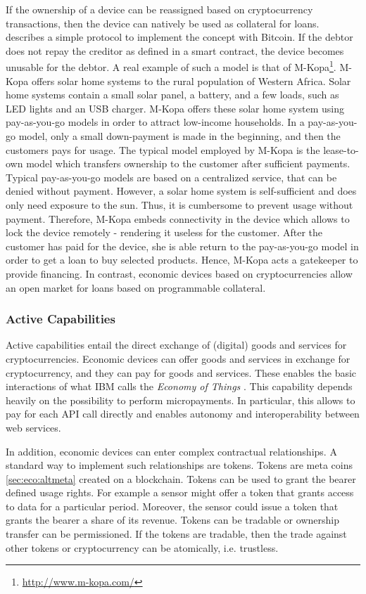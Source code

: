If the ownership of a device can be reassigned based on cryptocurrency transactions, then the device can natively be used as collateral for loans. \cite{smartproperty2011} describes a simple protocol to implement the concept with Bitcoin. If the debtor does not repay the creditor as defined in a smart contract, the device becomes unusable for the debtor. A real example of such a model is that of M-Kopa\footnote{\url{http://www.m-kopa.com/}}. M-Kopa offers solar home systems to the rural population of Western Africa. Solar home systems contain a small solar panel, a battery, and a few loads, such as LED lights and an USB charger. M-Kopa offers these solar home system using pay-as-you-go models in order to attract low-income households. In a pay-as-you-go model, only a small down-payment is made in the beginning, and then the customers pays for usage. The typical model employed by M-Kopa is the lease-to-own model which transfers ownership to the customer after sufficient payments. Typical pay-as-you-go models are based on a centralized service, that can be denied without payment. However, a solar home system is self-sufficient and does only need exposure to the sun. Thus, it is cumbersome to prevent usage without payment. Therefore, M-Kopa embeds connectivity in the device which allows to lock the device remotely - rendering it useless for the customer. After the customer has paid for the device, she is able return to the pay-as-you-go model in order to get a loan to buy selected products. Hence, M-Kopa acts a gatekeeper to provide financing. In contrast, economic devices based on cryptocurrencies allow an open market for loans based on programmable collateral.

\subsubsection{Active Capabilities}

Active capabilities entail the direct exchange of (digital) goods and services for cryptocurrencies. Economic devices can offer goods and services in exchange for cryptocurrency, and they can pay for goods and services. These enables the basic interactions of what IBM calls the \emph{Economy of Things} \parencite{Pureswaran2015}. This capability depends heavily on the possibility to perform micropayments. In particular, this allows to pay for each \ac{API} call directly and enables autonomy and interoperability between web services. 

In addition, economic devices can enter complex contractual relationships. A standard way to implement such relationships are tokens. Tokens are meta coins \ref{sec:eco:altmeta} created on a blockchain. Tokens can be used to grant the bearer defined usage rights. For example a sensor might offer a token that grants access to data for a particular period. Moreover, the sensor could issue a token that grants the bearer a share of its revenue. Tokens can be tradable or ownership transfer can be permissioned. If the tokens are tradable, then the trade against other tokens or cryptocurrency can be atomically, i.e. trustless.

